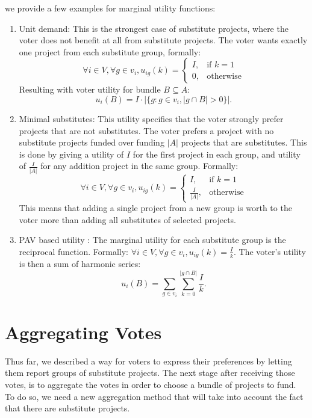 \documentclass[runningheads]{llncs}
\begin{document}
we provide a few examples for  marginal utility functions:
\begin{enumerate}
    \item Unit demand: This is the strongest case of substitute projects, where the voter does not benefit at all from substitute projects. The voter wants exactly one project from each substitute group, formally: $$\forall i\in V, \forall g\in v_i, u_{ig}(k)= 
        \begin{cases}
            I             ,& \text{if } k=1\\
            0,             & \text{otherwise}
        \end{cases}$$
    Resulting with voter utility for bundle $B\subseteq A$: $$u_i(B)=I\cdot|\{g : g\in v_i, |g\cap B|>0\}|.$$

    \item Minimal substitutes: This utility specifies that the voter strongly prefer projects that are not substitutes.  The voter prefers  a project with no substitute projects funded over funding $|A|$ projects that are substitutes.
    This is done by giving a utility of $I$ for the first project in each group, and utility of $\frac{I}{|A|}$ for any addition project in the same group. Formally: $$\forall i\in V, \forall g\in v_i, u_{ig}(k)= 
        \begin{cases}
            I                         ,& \text{if } k=1\\
            \frac{I}{|A|},             & \text{otherwise}
        \end{cases}$$
    This means that adding a single project from a new group is worth to the voter more than adding all substitutes of selected projects.
    
    \item PAV based utility \cite{thiele1895om}:  The marginal utility for each substitute group is the reciprocal function. Formally: $\forall i\in V, \forall g\in v_i, u_{ig}(k)=\frac{I}{k}$. The voter's utility is then a sum of harmonic series: $$u_i(B)=\sum_{g\in{v_i}}\sum_{k=0}^{|g\cap B|}\frac{I}{k}.$$
\end{enumerate}



\section{Aggregating Votes}
Thus far, we described a way for voters to express their preferences by letting them report groups of substitute projects. The next stage after receiving those votes, is to aggregate the votes in order to choose a bundle of projects to fund. To do so, we need a new aggregation method that will take into account the fact that there are substitute projects.
\end{document}
